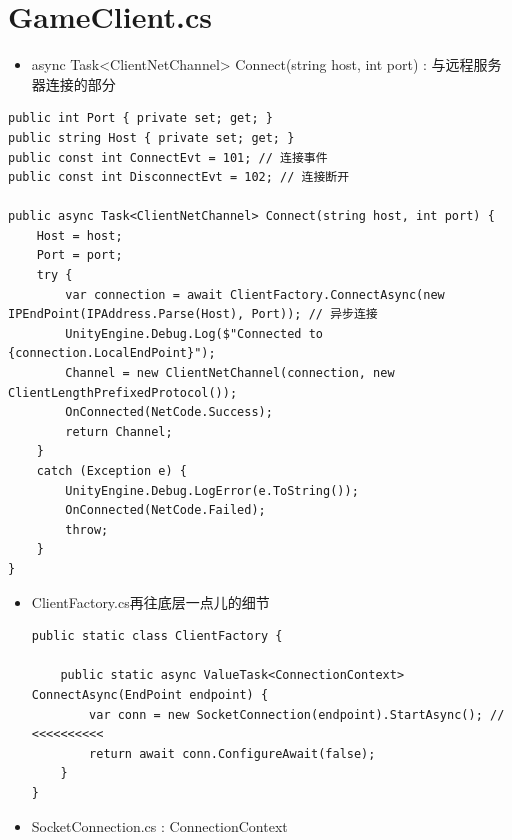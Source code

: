 \documentclass[9pt, b5paper]{article}
\begin{document}
\section{GameClient.cs}
\label{sec-7}
\begin{itemize}
\item async Task<ClientNetChannel> Connect(string host, int port) : 与远程服务器连接的部分
\end{itemize}
\begin{verbatim}
public int Port { private set; get; }
public string Host { private set; get; }
public const int ConnectEvt = 101; // 连接事件
public const int DisconnectEvt = 102; // 连接断开

public async Task<ClientNetChannel> Connect(string host, int port) {
    Host = host;
    Port = port;
    try {
        var connection = await ClientFactory.ConnectAsync(new IPEndPoint(IPAddress.Parse(Host), Port)); // 异步连接
        UnityEngine.Debug.Log($"Connected to {connection.LocalEndPoint}");
        Channel = new ClientNetChannel(connection, new ClientLengthPrefixedProtocol());
        OnConnected(NetCode.Success);
        return Channel;
    }
    catch (Exception e) {
        UnityEngine.Debug.LogError(e.ToString());
        OnConnected(NetCode.Failed);
        throw;
    }
}
\end{verbatim}
\begin{itemize}
\item ClientFactory.cs再往底层一点儿的细节
\begin{verbatim}
public static class ClientFactory {

    public static async ValueTask<ConnectionContext> ConnectAsync(EndPoint endpoint) {
        var conn = new SocketConnection(endpoint).StartAsync(); // <<<<<<<<<< 
        return await conn.ConfigureAwait(false);
    }
}
\end{verbatim}
\item SocketConnection.cs : ConnectionContext
\end{itemize}
\end{document}
